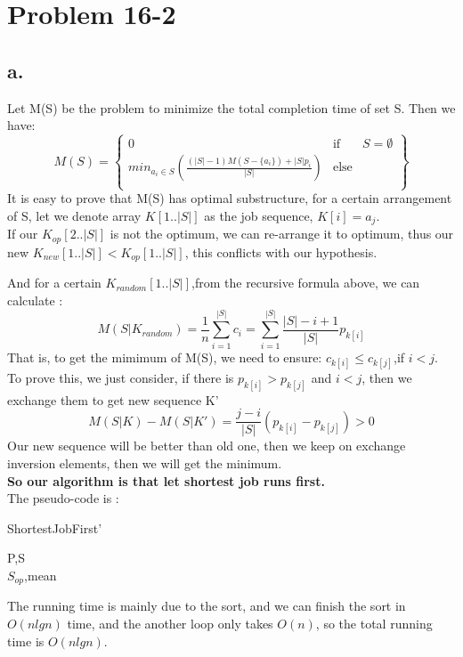 \documentclass[oneside]{homework} %
\begin{document}
\maketitle
\newpage
\section{Problem 16-2}
\subsection*{a.}
Let M(S) be the problem to minimize the total completion time of set S. Then we have:
\begin{equation}
  M(S) = \left\{
	\begin{array}{lcl}
	  0 & \text{if} & {S = \emptyset} \\
	  min_{a_{i} \in S}(\frac{(|S|-1)M(S-\{a_{i}\})+|S|p_{i}}{|S|}) & \text{else} &  \\
	\end{array}
  \right\}
\end{equation}
It is easy to prove that M(S) has optimal substructure, for a certain arrangement of S, let we denote array $K[1..|S|]$ as the job sequence, $K[i] = a_{j}$.
\\ If our $K_{op}[2..|S|]$ is not the optimum, we can re-arrange it to optimum, thus our new $K_{new}[1..|S|] < K_{op}[1..|S|]$, this conflicts with our hypothesis.

And for a certain $K_{random}[1..|S|]$,from the recursive formula above, we can calculate : 
$$M(S|K_{random}) =\frac{1}{n} \sum_{i=1}^{|S|} c_{i} = \sum_{i=1}^{|S|}\frac{|S|-i+1}{|S|}p_{k[i]}$$
That is, to get the mimimum of M(S), we need to ensure:
$c_{k[i]} \leq c_{k[j]}$,if $i<j$.
To prove this, we just consider, if there is $p_{k[i]} > p_{k[j]}$ and $i<j$, then we exchange them to get new sequence K'
$$M(S|K) - M(S|K') = \frac{j-i}{|S|}(p_{k[i]}-p_{k[j]})>0$$
Our new sequence will be better than old one, then we keep on exchange inversion elements, then we will get the minimum.
\\{\bfseries 
  So our algorithm is that let shortest job runs first.
}
\\ The pseudo-code is :
\begin{algorithm}[h]
\caption{ShortestJobFirst'}
\label{algo:SJF}
\begin{algorithmic}[1]
  \REQUIRE P,S 
  \ENSURE ~ ~\\ 
  \ENDFOR
  \LASTCON $S_{op}$,mean	
\end{algorithmic}
\end{algorithm}
The running time is mainly due to the sort, and we can finish the sort in $O(nlgn)$ time, and the another loop only takes $O(n)$, so the total running time is $O(nlgn)$.
\end{document}
